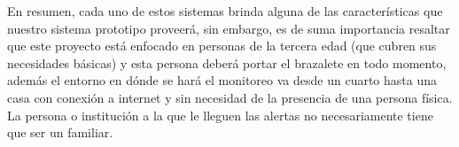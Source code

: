 En resumen, cada uno de estos sistemas brinda alguna de las características que nuestro sistema prototipo proveerá, sin embargo, es de suma importancia resaltar que este proyecto está enfocado en personas de la tercera edad (que cubren sus necesidades básicas) y esta persona deberá portar el brazalete en todo momento, además el entorno en dónde se hará el monitoreo va desde un cuarto hasta una casa con conexión a internet y sin necesidad de la presencia de una persona física. La persona o institución a la que le lleguen las alertas no necesariamente tiene que ser un familiar.
